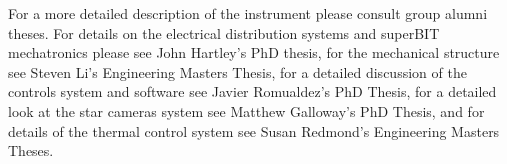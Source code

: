 \par
For a more detailed description of the instrument please consult group alumni theses. For details on the electrical distribution systems and
superBIT mechatronics please see John Hartley's PhD thesis, for the mechanical structure see Steven Li’s Engineering Masters Thesis, for a detailed discussion of the controls system and software see Javier Romualdez’s PhD Thesis, for a detailed look at the star cameras system see Matthew Galloway’s PhD Thesis, and for details of the thermal control system see Susan Redmond’s Engineering Masters Theses.

